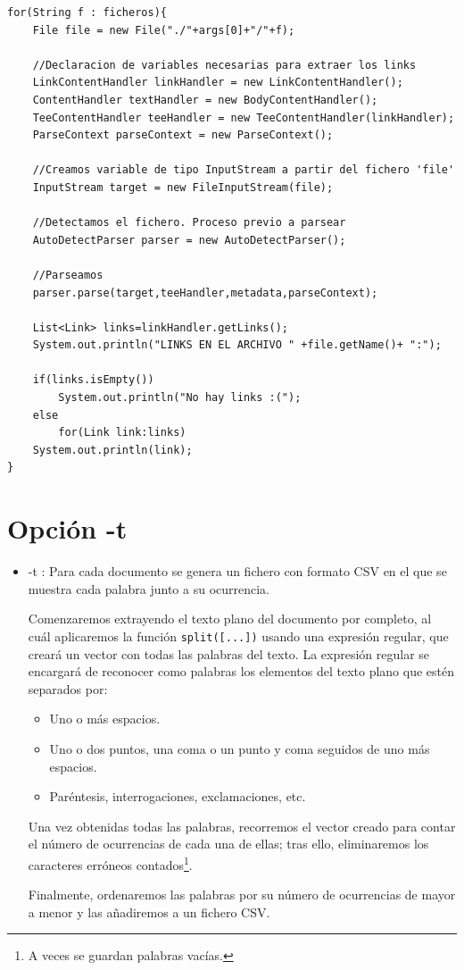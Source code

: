 \lstset{language=C, breaklines=true, basicstyle=\footnotesize}
\begin{lstlisting}[frame=single]
for(String f : ficheros){
	File file = new File("./"+args[0]+"/"+f);
	
	//Declaracion de variables necesarias para extraer los links
	LinkContentHandler linkHandler = new LinkContentHandler();
	ContentHandler textHandler = new BodyContentHandler();
	TeeContentHandler teeHandler = new TeeContentHandler(linkHandler);
	ParseContext parseContext = new ParseContext();
	
	//Creamos variable de tipo InputStream a partir del fichero 'file'
	InputStream target = new FileInputStream(file);

	//Detectamos el fichero. Proceso previo a parsear
	AutoDetectParser parser = new AutoDetectParser();

	//Parseamos 
	parser.parse(target,teeHandler,metadata,parseContext);
					
	List<Link> links=linkHandler.getLinks();
	System.out.println("LINKS EN EL ARCHIVO " +file.getName()+ ":");
					
	if(links.isEmpty())
		System.out.println("No hay links :(");
	else
		for(Link link:links)
	System.out.println(link);					
}
\end{lstlisting}

\newpage	
	
\section{Opción -t}
\begin{itemize}
	\item -t : Para cada documento se genera un fichero con formato CSV en el que se muestra cada palabra junto a su ocurrencia.
	
	Comenzaremos extrayendo el texto plano del documento por completo, al cuál aplicaremos la función \texttt{split([...])} usando una expresión regular, que creará un vector con todas las palabras del texto. La expresión regular se encargará de reconocer como palabras los elementos del texto plano que estén separados por:
	\begin{itemize}
	\item Uno o más espacios.
	\item Uno o dos puntos, una coma o un punto y coma seguidos de uno más espacios.
	\item Paréntesis, interrogaciones, exclamaciones, etc.
	\end{itemize}
	
	Una vez obtenidas todas las palabras, recorremos el vector creado para contar el número de ocurrencias de cada una de ellas; tras ello, eliminaremos los caracteres erróneos contados\footnote{A veces se guardan palabras vacías.}.
	
	Finalmente, ordenaremos las palabras por su número de ocurrencias de mayor a menor y las añadiremos a un fichero CSV.
\end{itemize}

